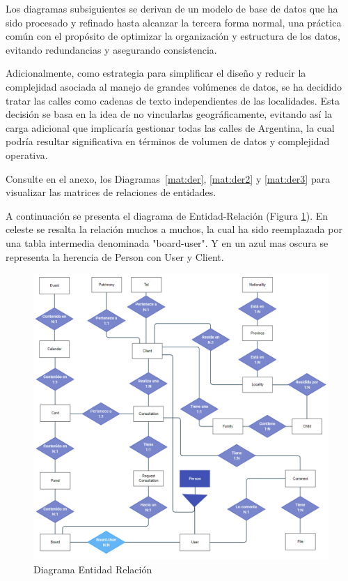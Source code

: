Los diagramas subsiguientes se derivan de un modelo de base de datos que ha sido procesado y refinado hasta alcanzar la tercera forma normal, una práctica común con el propósito de optimizar la organización y estructura de los datos, evitando redundancias y asegurando consistencia.

Adicionalmente, como estrategia para simplificar el diseño y reducir la complejidad asociada al manejo de grandes volúmenes de datos, se ha decidido tratar las calles como cadenas de texto independientes de las localidades. Esta decisión se basa en la idea de no vincularlas geográficamente, evitando así la carga adicional que implicaría gestionar todas las calles de Argentina, la cual podría resultar significativa en términos de volumen de datos y complejidad operativa.

Consulte en el anexo, los Diagramas~\ref{mat:der}, \ref{mat:der2} y \ref{mat:der3} para visualizar las matrices de relaciones de entidades.



A continuación se presenta el diagrama de Entidad-Relación (Figura \ref{fig:der}). En celeste se resalta la relación muchos a muchos, la cual ha sido reemplazada por una tabla intermedia denominada "board-user". Y en un azul mas oscura se representa la herencia de Person con User y Client.

\begin{figure}[H]
    \centering
    \includegraphics[width=1\linewidth]{fig/der.png}
    \caption{Diagrama Entidad Relación}
    \label{fig:der}
\end{figure}

